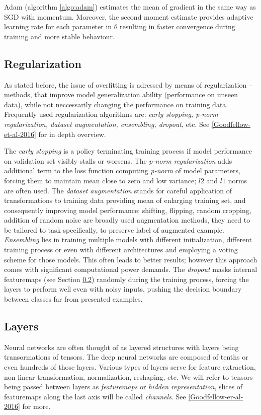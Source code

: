 Adam (algorithm \ref{algo:adam}) estimates the mean of gradient in the same way as SGD with momentum. Moreover, the second moment estimate provides adaptive learning rate for each parameter in $\theta$ resulting in faster convergence during training and more stable behaviour.

\subsection{Regularization}
\label{sec:regularization}

As stated before, the issue of overfitting is adressed by means of regularization -- methods, that improve model generalization ability (performance on unseen data), while not neccessarily changing the performance on training data. Frequently used regularization algorithms are: \emph{early stopping, p-norm regularization, dataset augmentation, ensembling, dropout}, etc. See \ref{Goodfellow-et-al-2016} for in depth overview.

The \emph{early stopping} is a policy terminating training process if model performance on validation set visibly stalls or worsens. The \emph{p-norm regularization} adds additional term to the loss function computing \emph{p-norm} of model parameters, forcing them to maintain mean close to zero and low variance; $l2$ and $l1$ norms are often used. The \emph{dataset augmentation} stands for careful application of transformations to training data providing mean of enlarging training set, and consequently improving model performance; shifting, flipping, random cropping, addition of random noise are broadly used augmentation methods, they need to be tailored to task specifically, to preserve label of augmented example. \emph{Ensembling} lies in training multiple models with different initialization, different training process or even with different architectures and employing a voting scheme for those models. This often leads to better results; however this approach comes with significant computational power demands. The \emph{dropout} masks internal featuremaps (see Section \ref{sec:layers}) randomly during the training process, forcing the layers to perform well even with noisy inputs, pushing the decision boundary between classes far from presented examples.

\subsection{Layers}
\label{sec:layers}
Neural networks are often thought of as layered structures with layers being transormations of tensors. The deep neural networks are composed of tenths or even hundreds of those layers. Various types of layers serve for feature extraction, non-linear transformation, normalization, reshaping, etc. We will refer to tensors being passed between layers as \emph{featuremaps} or \emph{hidden representation}, slices of featuremaps along the last axis will be called \emph{channels}. See \ref{Goodfellow-er-al-2016} for more.

